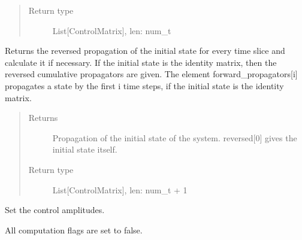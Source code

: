\documentclass[letterpaper,10pt,english]{sphinxmanual}
\begin{document}
\begin{fulllineitems}
\begin{fulllineitems}
\begin{quote}
\begin{description}
\item[{Return type}] \leavevmode
List{[}ControlMatrix{]}, len: num\_t

\end{description}\end{quote}

\end{fulllineitems}


\begin{fulllineitems}
\label{\detokenize{qsim:qsim.solver_algorithms.Solver.reversed_propagators}}
Returns the reversed propagation of the initial state for every time
slice and calculate it if necessary. If the initial state is the
identity matrix, then the reversed cumulative propagators are given.
The element forward\_propagators{[}i{]} propagates a state by the first i
time steps, if the initial state is the identity matrix.
\begin{quote}\begin{description}
\item[{Returns}] \leavevmode
{} \textendash{} Propagation of the initial state of the system. reversed{[}0{]} gives
the initial state itself.

\item[{Return type}] \leavevmode
List{[}ControlMatrix{]}, len: num\_t + 1

\end{description}\end{quote}

\end{fulllineitems}


\begin{fulllineitems}
\label{\detokenize{qsim:qsim.solver_algorithms.Solver.set_optimization_parameters}}
Set the control amplitudes.

All computation flags are set to false.


\end{fulllineitems}
\end{fulllineitems}
\end{document}
